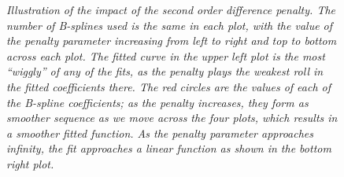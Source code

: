 \begin{figure}[H]
\begin{subfigure}{.5\textwidth}
  \label{fig:pspline_small_lambda}
\end{subfigure}
\caption{\textit{Illustration of the impact of the second order difference penalty. The number of B-splines used is the same in each plot, with the value of the penalty parameter increasing from left to right and top to bottom across each plot. The fitted curve in the upper left plot is the most ``wiggly'' of any of the fits, as the penalty plays the weakest roll in the fitted coefficients there. The red circles are the values of each of the B-spline coefficients; as the penalty increases, they form as smoother sequence as we move across the four plots, which results in a smoother fitted function. As the penalty parameter approaches infinity, the fit approaches a linear function as shown in the bottom right plot.}}
\label{fig:second-ord-PS-pen-SML-lambda}
\end{figure}



